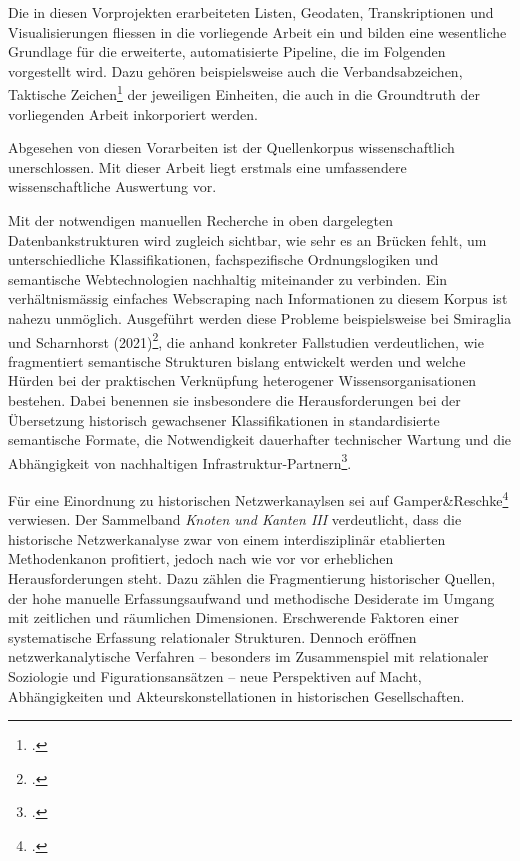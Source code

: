 \documentclass[12pt, a4paper, ngerman, bidi=default]{article}
\let\cite\footcite
\begin{document}
Die in diesen Vorprojekten erarbeiteten Listen, Geodaten, Transkriptionen und Visualisierungen fliessen in die vorliegende Arbeit ein
und bilden eine wesentliche Grundlage für die erweiterte, automatisierte Pipeline, die im Folgenden vorgestellt wird. Dazu gehören beispielsweise auch die Verbandsabzeichen, 
Taktische Zeichen\cite[vgl][S.64-66]{haupt_buch_1982} der jeweiligen Einheiten, die auch in die Groundtruth der vorliegenden Arbeit inkorporiert werden.

Abgesehen von diesen Vorarbeiten ist der Quellenkorpus wissenschaftlich unerschlossen. Mit dieser Arbeit liegt erstmals eine
umfassendere wissenschaftliche Auswertung vor.

Mit der notwendigen manuellen Recherche in oben dargelegten Datenbankstrukturen wird zugleich sichtbar, wie sehr es an Brücken fehlt, 
um unterschiedliche Klassifikationen, fachspezifische Ordnungslogiken und semantische Webtechnologien nachhaltig miteinander zu verbinden. Ein verhältnismässig einfaches
Webscraping nach Informationen zu diesem Korpus ist nahezu unmöglich. Ausgeführt werden diese Probleme beispielsweise bei 
Smiraglia und Scharnhorst (2021)\cite[vgl.][]{richard_linking_2022}, 
 die anhand konkreter Fallstudien verdeutlichen, wie fragmentiert semantische Strukturen bislang entwickelt werden 
 und welche Hürden bei der praktischen Verknüpfung heterogener Wissensorganisationen bestehen. Dabei benennen sie insbesondere die 
 Herausforderungen bei der Übersetzung historisch gewachsener Klassifikationen in standardisierte semantische Formate, 
 die Notwendigkeit dauerhafter technischer Wartung und die Abhängigkeit von nachhaltigen Infrastruktur-Partnern\cite[vgl.][Kap. 2 und 5]{richard_linking_2022}.

Für eine Einordnung zu historischen Netzwerkanaylsen sei auf Gamper\&Reschke\cite{gamper_knoten_2015} verwiesen. Der Sammelband
\textit{Knoten und Kanten III} verdeutlicht, dass die historische Netzwerkanalyse zwar von einem interdisziplinär etablierten Methodenkanon 
profitiert, jedoch nach wie vor vor erheblichen Herausforderungen steht. Dazu zählen die Fragmentierung historischer Quellen, der hohe manuelle 
Erfassungsaufwand und methodische Desiderate im Umgang mit zeitlichen und räumlichen Dimensionen. Erschwerende Faktoren einer systematische Erfassung 
relationaler Strukturen. Dennoch eröffnen netzwerkanalytische Verfahren – besonders im Zusammenspiel mit relationaler Soziologie 
und Figurationsansätzen – neue Perspektiven auf Macht, Abhängigkeiten und Akteurskonstellationen in historischen Gesellschaften.
\end{document}
